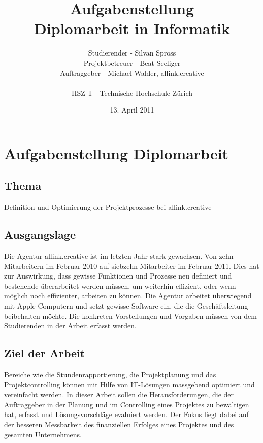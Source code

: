 \documentclass[]{scrreprt}
\title{Aufgabenstellung\\
    Diplomarbeit in Informatik}
\author{Studierender - Silvan Spross\\
    Projektbetreuer - Beat Seeliger\\
    Auftraggeber - Michael Walder, allink.creative\\
    \\
    HSZ-T - Technische Hochschule Zürich}
\date{13. April 2011}
\begin{document}
    \ifpdf
    \else
    \fi

    \maketitle



    \chapter{Aufgabenstellung Diplomarbeit}

    \section{Thema}
    Definition und Optimierung der Projektprozesse bei allink.creative

    \section{Ausgangslage}
    Die Agentur allink.creative ist im letzten Jahr stark gewachsen. Von zehn
    Mitarbeitern im Februar 2010 auf siebzehn Mitarbeiter im Februar 2011. Dies hat 
    zur Auswirkung, dass gewisse Funktionen und Prozesse neu definiert und bestehende
    überarbeitet werden müssen, um weiterhin effizient, oder wenn möglich noch 
    effizienter, arbeiten zu können. Die Agentur arbeitet überwiegend mit Apple
    Computern und setzt gewisse Software ein, die die Geschäftsleitung beibehalten 
    möchte. Die konkreten Vorstellungen und Vorgaben müssen von dem Studierenden
    in der Arbeit erfasst werden.

    \section{Ziel der Arbeit}
    Bereiche wie die Stundenrapportierung, die Projektplanung und das Projektcontrolling 
    können mit Hilfe von IT-Lösungen massgebend optimiert und vereinfacht werden. 
    In dieser Arbeit sollen die Herausforderungen, die der Auftraggeber in der 
    Planung und im Controlling eines Projektes zu bewältigen hat, erfasst und 
    Lösungsvorschläge evaluiert werden. Der Fokus liegt dabei auf der besseren 
    Messbarkeit des finanziellen Erfolges eines Projektes und des gesamten 
    Unternehmens.
    
\end{document}
